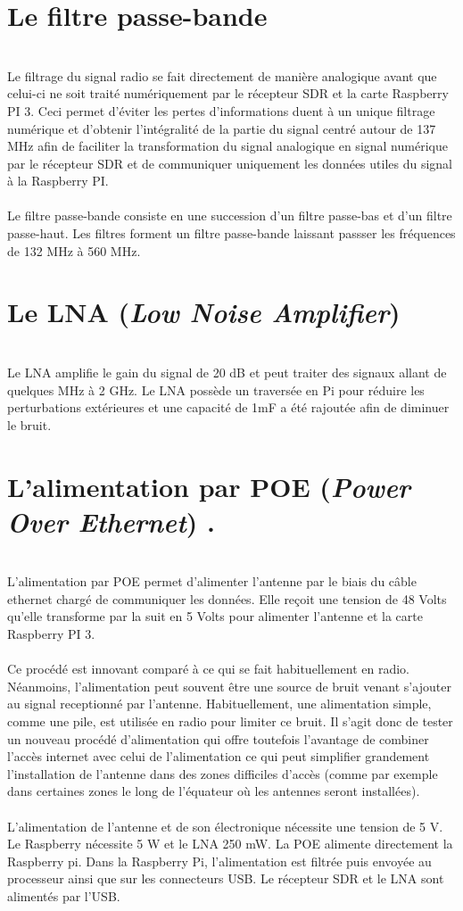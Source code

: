 \documentclass[12pt,fleqn]{book} %
\begin{document}
\section{Le filtre passe-bande}
~\\\indent Le filtrage du signal radio se fait directement de manière analogique avant que celui-ci ne soit traité numériquement par le récepteur SDR et la carte Raspberry PI 3. Ceci permet d'éviter les pertes d'informations duent à un unique filtrage numérique et d'obtenir l'intégralité de la partie du signal centré autour de 137 MHz afin de faciliter la transformation du signal analogique en signal numérique par le récepteur SDR et de communiquer uniquement les données utiles du signal à la Raspberry PI.
~\\\\Le filtre passe-bande consiste en une succession d'un filtre passe-bas et d'un filtre passe-haut. Les filtres forment un filtre passe-bande laissant passser les fréquences de 132 MHz à 560 MHz.
\section{Le LNA (\emph{Low Noise Amplifier})}
~\\\indent Le LNA amplifie le gain du signal de 20 dB et peut traiter des signaux allant de quelques MHz à 2 GHz. Le LNA possède un traversée en Pi pour réduire les perturbations extérieures et une capacité de 1mF a été rajoutée afin de diminuer le bruit.
\section{L'alimentation par POE (\emph{Power Over Ethernet})  \color{white}.}
~\\\indent L'alimentation par POE permet d'alimenter l'antenne par le biais du câble ethernet chargé de communiquer les données. Elle reçoit une tension de 48 Volts qu'elle transforme par la suit en 5 Volts pour alimenter l'antenne et la carte Raspberry PI 3.
~\\\\Ce procédé est innovant comparé à ce qui se fait habituellement en radio. Néanmoins, l'alimentation peut souvent être une source de bruit venant s'ajouter au signal receptionné par l'antenne. Habituellement, une alimentation simple, comme une pile, est utilisée en radio pour limiter ce bruit. Il s'agit donc de tester un nouveau procédé d'alimentation qui offre toutefois l'avantage de combiner l'accès internet avec celui de l'alimentation ce qui peut simplifier grandement l'installation  
de l'antenne dans des zones difficiles d'accès (comme par exemple dans certaines zones le long de l'équateur où les antennes seront installées).
~\\\\L’alimentation de l’antenne et de son électronique nécessite une tension de 5 V. Le Raspberry nécessite 5 W et le LNA 250 mW. La POE alimente directement la Raspberry pi. Dans la Raspberry Pi, l’alimentation est filtrée puis envoyée au processeur ainsi que sur les connecteurs USB. Le récepteur SDR et le LNA sont alimentés par l’USB.
\end{document}
